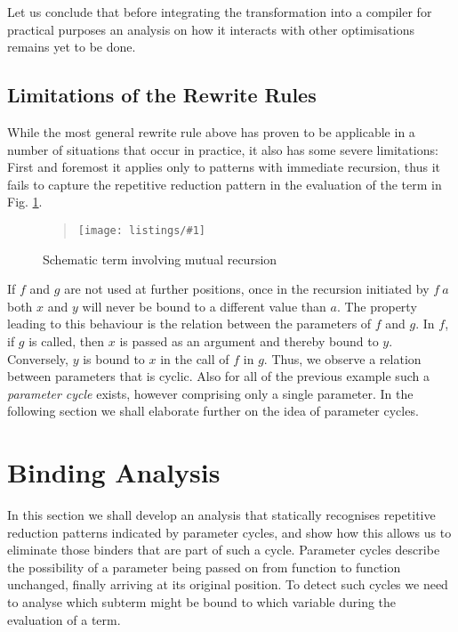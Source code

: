 \documentclass[submission,copyright,creativecommons]{eptcs}
\newcommand\listing[1]{\begin{quotation}\noindent\texttt{[image: listings/\#1]}\end{quotation}}
\newcommand\haskell[1]{\ensuremath{\mathit{#1}}}
\renewcommand\;{\,}
\begin{document}
Let us conclude that before integrating the transformation into a compiler for
practical purposes an analysis on how it interacts with other optimisations
remains yet to be done. 

\subsection{Limitations of the Rewrite Rules}


While the most general rewrite rule above has proven to be applicable in a number of situations
that occur in practice, it also has some severe limitations: 
First and foremost it applies only to patterns with immediate recursion, thus
it fails to capture the repetitive reduction pattern in the evaluation of
the term in Fig. \ref{mutual}.
\begin{figure}[h]
\listing{mutual}
\caption{\label{mutual}Schematic term involving mutual recursion}
\end{figure}
If \haskell{f} and \haskell{g} are not used at further positions, once in the
recursion initiated by $f~a$ both $x$ and $y$ will never be bound to a
different value than $a$. The property leading to this behaviour is the
relation between the parameters of $f$ and $g$. In $f$, if $g$ is called, then $x$ is
passed as an argument and thereby bound to $y$. Conversely, $y$ is bound to $x$
in the call of $f$ in $g$. Thus, we observe a relation between parameters that
is cyclic. Also for all of the previous example such a {\it parameter cycle}
exists, however comprising only a single parameter. In the following section we
shall elaborate further on the idea of parameter cycles.

\section{Binding Analysis}\label{sec:binding:analysis}


In this section we shall develop an analysis that statically recognises
repetitive reduction patterns indicated by parameter cycles, and show how this
allows us to eliminate those binders that are part of such a cycle. Parameter
cycles describe the possibility of a parameter being passed on from function to
function unchanged, finally arriving at its original position. To detect such
cycles we need to analyse which subterm might be bound to which variable during
the evaluation of a term.
\end{document}
